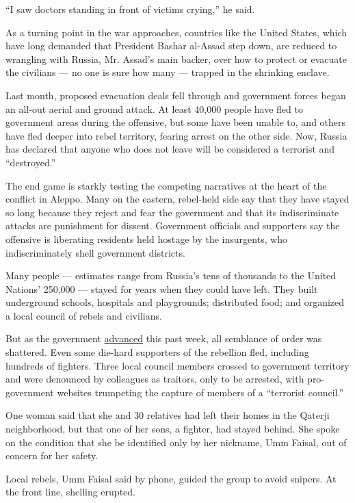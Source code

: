 ``I saw doctors standing in front of victims crying,'' he said.

As a turning point in the war approaches, countries like the United
States, which have long demanded that President Bashar al-Assad step
down, are reduced to wrangling with Russia, Mr. Assad's main backer,
over how to protect or evacuate the civilians --- no one is sure how
many --- trapped in the shrinking enclave.

Last month, proposed evacuation deals fell through and government forces
began an all-out aerial and ground attack. At least 40,000 people have
fled to government areas during the offensive, but some have been unable
to, and others have fled deeper into rebel territory, fearing arrest on
the other side. Now, Russia has declared that anyone who does not leave
will be considered a terrorist and ``destroyed.''

The end game is starkly testing the competing narratives at the heart of
the conflict in Aleppo. Many on the eastern, rebel-held side say that
they have stayed so long because they reject and fear the government and
that its indiscriminate attacks are punishment for dissent. Government
officials and supporters say the offensive is liberating residents held
hostage by the insurgents, who indiscriminately shell government
districts.

Many people --- estimates range from Russia's tens of thousands to the
United Nations' 250,000 --- stayed for years when they could have left.
They built underground schools, hospitals and playgrounds; distributed
food; and organized a local council of rebels and civilians.

But as the government
\href{https://www.nytimes3xbfgragh.onion/2016/12/07/world/middleeast/syria-aleppo.html}{advanced}
this past week, all semblance of order was shattered. Even some die-hard
supporters of the rebellion fled, including hundreds of fighters. Three
local council members crossed to government territory and were denounced
by colleagues as traitors, only to be arrested, with pro-government
websites trumpeting the capture of members of a ``terrorist council.''

One woman said that she and 30 relatives had left their homes in the
Qaterji neighborhood, but that one of her sons, a fighter, had stayed
behind. She spoke on the condition that she be identified only by her
nickname, Umm Faisal, out of concern for her safety.

Local rebels, Umm Faisal said by phone, guided the group to avoid
snipers. At the front line, shelling erupted.

